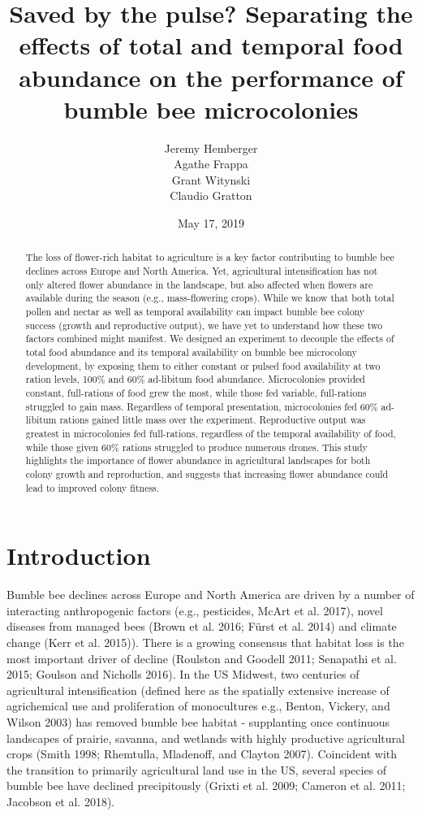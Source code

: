 \documentclass[11pt,]{article}
\title{Saved by the pulse? Separating the effects of total and temporal food
abundance on the performance of bumble bee microcolonies}
\author{Jeremy Hemberger \\ Agathe Frappa \\ Grant Witynski \\ Claudio Gratton}
\date{May 17, 2019}
\begin{document}
\maketitle
\begin{abstract}
The loss of flower-rich habitat to agriculture is a key factor
contributing to bumble bee declines across Europe and North America.
Yet, agricultural intensification has not only altered flower abundance
in the landscape, but also affected when flowers are available during
the season (e.g., mass-flowering crops). While we know that both total
pollen and nectar as well as temporal availability can impact bumble bee
colony success (growth and reproductive output), we have yet to
understand how these two factors combined might manifest. We designed an
experiment to decouple the effects of total food abundance and its
temporal availability on bumble bee microcolony development, by exposing
them to either constant or pulsed food availability at two ration
levels, 100\% and 60\% ad-libitum food abundance. Microcolonies provided
constant, full-rations of food grew the most, while those fed variable,
full-rations struggled to gain mass. Regardless of temporal
presentation, microcolonies fed 60\% ad-libitum rations gained little
mass over the experiment. Reproductive output was greatest in
microcolonies fed full-rations, regardless of the temporal availability
of food, while those given 60\% rations struggled to produce numerous
drones. This study highlights the importance of flower abundance in
agricultural landscapes for both colony growth and reproduction, and
suggests that increasing flower abundance could lead to improved colony
fitness.
\end{abstract}

\hypertarget{introduction}{%
\section{Introduction}\label{introduction}}

Bumble bee declines across Europe and North America are driven by a
number of interacting anthropogenic factors (e.g., pesticides, McArt et
al. 2017), novel diseases from managed bees (Brown et al. 2016; Fürst et
al. 2014) and climate change (Kerr et al. 2015)). There is a growing
consensus that habitat loss is the most important driver of decline
(Roulston and Goodell 2011; Senapathi et al. 2015; Goulson and Nicholls
2016). In the US Midwest, two centuries of agricultural intensification
(defined here as the spatially extensive increase of agrichemical use
and proliferation of monocultures e.g., Benton, Vickery, and Wilson
2003) has removed bumble bee habitat - supplanting once continuous
landscapes of prairie, savanna, and wetlands with highly productive
agricultural crops (Smith 1998; Rhemtulla, Mladenoff, and Clayton 2007).
Coincident with the transition to primarily agricultural land use in the
US, several species of bumble bee have declined precipitously (Grixti et
al. 2009; Cameron et al. 2011; Jacobson et al. 2018).
\end{document}
